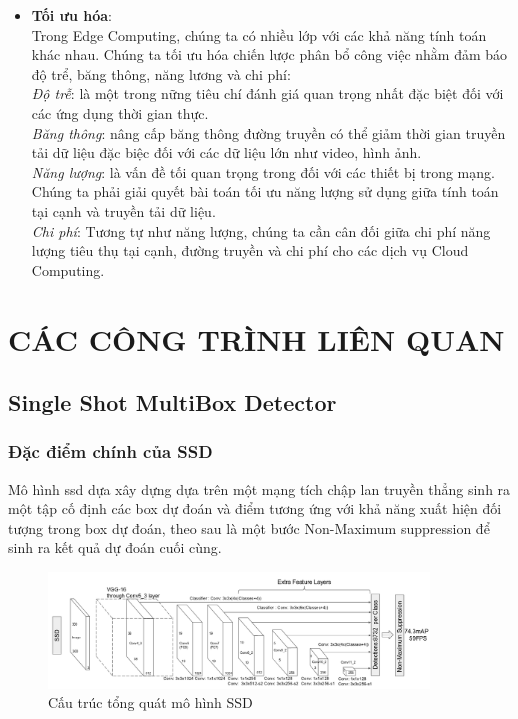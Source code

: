 \documentclass[a4paper]{report}
\begin{document}
\begin{itemize}
\item \textbf{Tối ưu hóa}:\\

Trong Edge Computing, chúng ta có nhiều lớp với các khả năng tính toán khác nhau. Chúng ta tối ưu hóa chiến lược phân bổ công việc nhằm đảm báo độ trể, băng thông, năng lương và chi phí:\\

\textit{Độ trễ}: là một trong nững tiêu chí đánh giá quan trọng nhất đặc biệt đối với các ứng dụng thời gian thực. \\

\textit{Băng thông}: nâng cấp băng thông đường truyền có thể giảm thời gian truyền tải dữ liệu đặc biệc đối với các dữ liệu lớn như video, hình ảnh. \\

\textit{Năng lượng}:
 là vấn đề tối quan trọng trong đối với các thiết bị trong mạng. Chúng ta phải giải quyết bài toán tối ưu năng lượng sử dụng giữa tính toán tại cạnh và truyền tải dữ liệu.\\
 
\textit{Chi phí}: Tương tự như năng lượng, chúng ta cần cân đối giữa chi phí năng lượng tiêu thụ tại cạnh, đường truyền và chi phí cho các dịch vụ Cloud Computing.
\end{itemize}

\chapter{CÁC CÔNG TRÌNH LIÊN QUAN }
\section{Single Shot MultiBox Detector}
\subsection{Đặc điểm chính của SSD}
Mô hình ssd dựa xây dựng dựa trên một mạng tích chập lan truyền thẳng sinh ra một tập cố định các box dự đoán và điểm tương ứng với khả năng xuất hiện đối tượng trong box dự đoán, theo sau là một bước Non-Maximum suppression để sinh ra kết quả dự đoán cuối cùng. \\

\begin{figure}[h!]
	\centering
	\includegraphics[width=0.9\textwidth]{3_ssd_arch.png}
	\caption[Caption for LOF]{Cấu trúc tổng quát mô hình SSD \cite{ssd}}
\end{figure}
\end{document}
